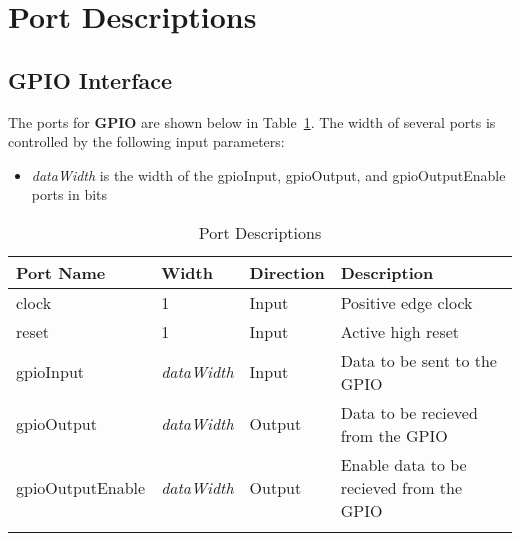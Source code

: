 \section{Port Descriptions}

\subsection{GPIO Interface}

The ports for \textbf{GPIO} are shown below in 
Table~\ref{table:ports}. The width of several ports is controlled 
by the following input parameters:

\begin{itemize}[noitemsep]
  \item \textit{dataWidth} is the width of the gpioInput, gpioOutput, and gpioOutputEnable ports in bits
\end{itemize}
 
\renewcommand*{\arraystretch}{1.4}
\begin{longtable}[H]{
  | p{}
  | p{}
  | p{}
  | p{} |
  }
  \hline
  \textbf{Port Name} &   
  \textbf{Width} &   
  \textbf{Direction} &   
  \textbf{Description} \\ \hline \hline

  clock &       
  1 &       
  Input &       
  Positive edge clock \\ \hline

  reset &       
  1 &       
  Input &       
  Active high reset \\ \hline

  gpioInput &       
  \textit{dataWidth} & 
  Input &       
  Data to be sent to the GPIO\\ \hline

  gpioOutput &        
  \textit{dataWidth} & 
  Output &       
  Data to be recieved from the GPIO \\ \hline

  gpioOutputEnable &      
  \textit{dataWidth} & 
  Output &     
  Enable data to be recieved from the GPIO \\ \hline
 
  \caption{Port Descriptions}\label{table:ports}
\end{longtable}


